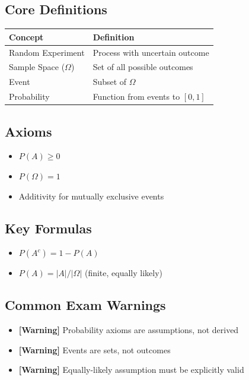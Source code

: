 \documentclass[11pt]{article}
\begin{document}
\subsection*{Core Definitions}
\begin{table}[h!]
    \centering
    \renewcommand{\arraystretch}{1.5}
    \begin{tabular}{|l|l|}
        \hline
        \textbf{Concept} & \textbf{Definition} \\ \hline
        Random Experiment & Process with uncertain outcome \\ \hline
        Sample Space ($\Omega$) & Set of all possible outcomes \\ \hline
        Event & Subset of $\Omega$ \\ \hline
        Probability & Function from events to $[0,1]$ \\ \hline
    \end{tabular}
\end{table}

\subsection*{Axioms}
\begin{itemize}
    \item $P(A) \ge 0$
    \item $P(\Omega) = 1$
    \item Additivity for mutually exclusive events
\end{itemize}

\subsection*{Key Formulas}
\begin{itemize}
    \item $P(A^c) = 1 - P(A)$
    \item $P(A) = |A|/|\Omega|$ (finite, equally likely)
\end{itemize}

\subsection*{Common Exam Warnings}
\begin{itemize}
    \item \textbf{[Warning]} Probability axioms are assumptions, not derived
    \item \textbf{[Warning]} Events are sets, not outcomes
    \item \textbf{[Warning]} Equally-likely assumption must be explicitly valid
\end{itemize}
\end{document}
